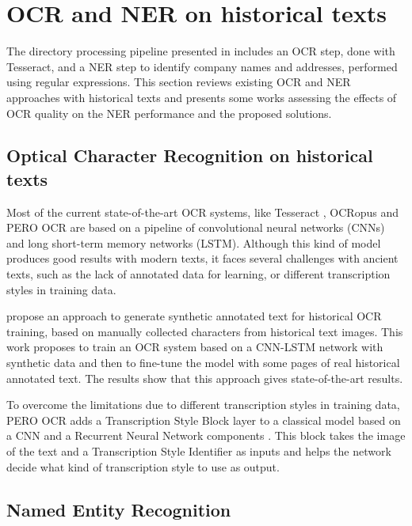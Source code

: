 \section{OCR and NER on historical texts}

The directory processing pipeline presented in \cite{bell2020automated} includes an OCR step, done with Tesseract, and a NER step to identify company names and addresses, performed using regular expressions.
This section reviews existing OCR and NER approaches with historical texts and presents some works assessing the effects of OCR quality on the NER performance and the proposed solutions. 

\subsection{Optical Character Recognition on historical texts}

Most of the current state-of-the-art OCR systems, like Tesseract \cite{smith2007overview}, OCRopus \cite{breuel2008ocropus} and PERO OCR \cite{kohut2021ts} are based on a pipeline of convolutional neural networks (CNNs) and long short-term memory networks (LSTM).
Although this kind of model produces good results with modern texts, it faces several challenges with ancient texts, such as the lack of annotated data for learning, or different transcription styles in training data.

\cite{martinek2019hybrid} propose an approach to generate synthetic annotated text for historical OCR training, based on manually collected characters from historical text images.
This work proposes to train an OCR system based on a CNN-LSTM network with synthetic data and then to fine-tune the model with some pages of real historical annotated text.
The results show that this approach gives state-of-the-art results. 

To overcome the limitations due to different transcription styles in training data, PERO OCR adds a Transcription Style Block layer to a classical model based on a CNN and a Recurrent Neural Network components \cite{kohut2021ts}.
This block takes the image of the text and a Transcription Style Identifier as inputs and helps the network decide what kind of transcription style to use as output.


\subsection{Named Entity Recognition}

